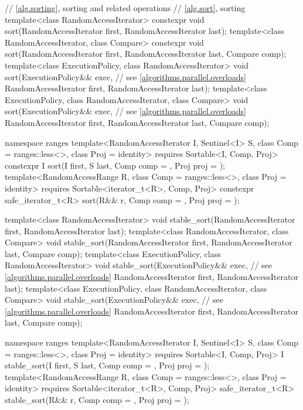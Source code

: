 \begin{codeblock}
{  // \ref{alg.sorting}, sorting and related operations
  // \ref{alg.sort}, sorting
  template<class RandomAccessIterator>
    constexpr void sort(RandomAccessIterator first, RandomAccessIterator last);
  template<class RandomAccessIterator, class Compare>
    constexpr void sort(RandomAccessIterator first, RandomAccessIterator last,
                        Compare comp);
  template<class ExecutionPolicy, class RandomAccessIterator>
    void sort(ExecutionPolicy&& exec, // see \ref{algorithms.parallel.overloads}
              RandomAccessIterator first, RandomAccessIterator last);
  template<class ExecutionPolicy, class RandomAccessIterator, class Compare>
    void sort(ExecutionPolicy&& exec, // see \ref{algorithms.parallel.overloads}
              RandomAccessIterator first, RandomAccessIterator last,
              Compare comp);

  namespace ranges {
    template<RandomAccessIterator I, Sentinel<I> S, class Comp = ranges::less<>,
             class Proj = identity>
      requires Sortable<I, Comp, Proj>
      constexpr I
        sort(I first, S last, Comp comp = {}, Proj proj = {});
    template<RandomAccessRange R, class Comp = ranges::less<>, class Proj = identity>
      requires Sortable<iterator_t<R>, Comp, Proj>
      constexpr safe_iterator_t<R>
        sort(R&& r, Comp comp = {}, Proj proj = {});
  }

  template<class RandomAccessIterator>
    void stable_sort(RandomAccessIterator first, RandomAccessIterator last);
  template<class RandomAccessIterator, class Compare>
    void stable_sort(RandomAccessIterator first, RandomAccessIterator last,
                     Compare comp);
  template<class ExecutionPolicy, class RandomAccessIterator>
    void stable_sort(ExecutionPolicy&& exec, // see \ref{algorithms.parallel.overloads}
                     RandomAccessIterator first, RandomAccessIterator last);
  template<class ExecutionPolicy, class RandomAccessIterator, class Compare>
    void stable_sort(ExecutionPolicy&& exec, // see \ref{algorithms.parallel.overloads}
                     RandomAccessIterator first, RandomAccessIterator last,
                     Compare comp);

  namespace ranges {
    template<RandomAccessIterator I, Sentinel<I> S, class Comp = ranges::less<>,
             class Proj = identity>
      requires Sortable<I, Comp, Proj>
      I stable_sort(I first, S last, Comp comp = {}, Proj proj = {});
    template<RandomAccessRange R, class Comp = ranges::less<>, class Proj = identity>
      requires Sortable<iterator_t<R>, Comp, Proj>
      safe_iterator_t<R>
        stable_sort(R&& r, Comp comp = {}, Proj proj = {});
  }

}
\end{codeblock}
